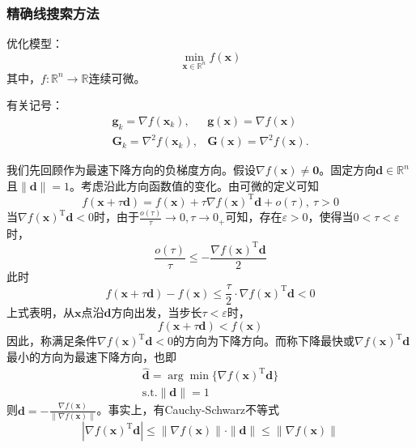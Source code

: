 \subsubsection{精确线搜索方法}
\begin{note}
    优化模型：
    \[
        \min\limits_{\boldsymbol{x}\in\mathbb{R}^n}f(\boldsymbol{x})
    \]
    其中，$f:\mathbb{R}^n\to\mathbb{R}$连续可微。
\end{note}
\begin{note}
    有关记号：
    \[
        \begin{array}{ll}
            \boldsymbol{g}_k=\nabla f(\boldsymbol{x}_k), & \boldsymbol{g}(\boldsymbol{x})=\nabla f(\boldsymbol{x})\\
            \boldsymbol{G}_k=\nabla^2f(\boldsymbol{x}_k), & \boldsymbol{G}(\boldsymbol{x})=\nabla^2f(\boldsymbol{x}).
        \end{array}
    \]
\end{note}
我们先回顾作为最速下降方向的负梯度方向。假设$\nabla f(\boldsymbol{x})\neq \boldsymbol{0}$。固定方向$\boldsymbol{d}\in \mathbb{R}^n$且$\|\boldsymbol{d}\| = 1$。考虑沿此方向函数值的变化。由可微的定义可知
\[
    f(\boldsymbol{x}+\tau \boldsymbol{d}) = f(\boldsymbol{x}) + \tau \nabla f(\boldsymbol{x})^{\mathrm{T}}\boldsymbol{d} + o(\tau),\ \tau>0
\]
当$\nabla f(\boldsymbol{x})^{\mathrm{T}}\boldsymbol{d}<0 $时，由于$\frac{o(\tau)}{\tau}\to 0,\tau\to 0_{+}$可知，存在$\varepsilon >0$，使得当$0<\tau<\varepsilon$时，
\[
    \dfrac{o(\tau)}{\tau}\leq -\dfrac{\nabla f(\boldsymbol{x})^{\mathrm{T}}\boldsymbol{d}}{2}
\]
此时
\[
    f(\boldsymbol{x}+\tau \boldsymbol{d})-f(\boldsymbol{x})\leq \dfrac{\tau}{2}\cdot \nabla f(\boldsymbol{x})^{\mathrm{T}}\boldsymbol{d}< 0
\]
上式表明，从$\boldsymbol{x}$点沿$\boldsymbol{d}$方向出发，当步长$\tau <\varepsilon$时，
\[
    f(\boldsymbol{x}+\tau \boldsymbol{d})<f(\boldsymbol{x})
\]
因此，称满足条件$\nabla f(\boldsymbol{x})^{\mathrm{T}}\boldsymbol{d}<0$的方向为下降方向。而称下降最快或$\nabla f(\boldsymbol{x})^{\mathrm{T}}\boldsymbol{d}$最小的方向为最速下降方向，也即
\[
    \begin{array}{c}
        \hat{\boldsymbol{d}} = \arg\min \{\nabla f(\boldsymbol{x})^{\mathrm{T}}\boldsymbol{d}\}\\
        \text{s.t.} \|\boldsymbol{d}\|=1
    \end{array} 
\]
则$\boldsymbol{d} = -\frac{\nabla f(\boldsymbol{x})}{\|\nabla f(\boldsymbol{x})\|}$。事实上，有Cauchy-Schwarz不等式
\[
    |\nabla f(\boldsymbol{x})^{\mathrm{T}} \boldsymbol{d}|\leq \|\nabla f(\boldsymbol{x}) \|\cdot \|\boldsymbol{d} \|\leq \|\nabla f(\boldsymbol{x}) \|
\]
